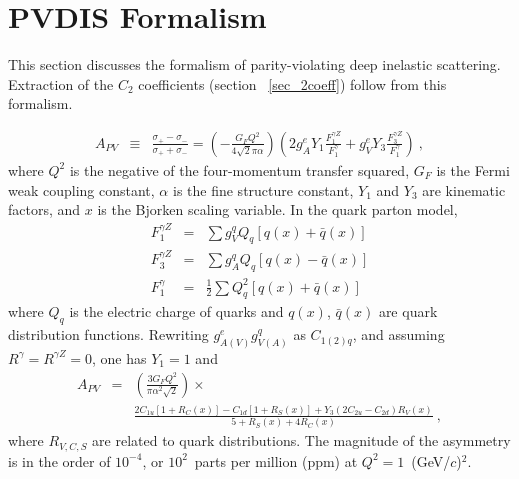 \section{PVDIS Formalism}\label{sec:formalism}

This section discusses the formalism of parity-violating deep inelastic
scattering.  Extraction of the $C_2$ coefficients (section ~\ref{sec_2coeff}) 
follow from this formalism.

%
\begin {eqnarray}
A_{PV}  &\equiv& \frac{\sigma_{+} - \sigma_{-}}{\sigma_{+} + \sigma_{-}}
=\left(-\frac{G_FQ^2}{4\sqrt{2}\pi \alpha}\right)
  \left(2g_A^e Y_1\frac{F_1^{\gamma Z}}{F_1^\gamma}+{g_V^e}Y_3\frac{F_3^{\gamma Z}}{F_1^\gamma}\right)~,
\end{eqnarray}
where $Q^2$ is the negative of the 
four-momentum transfer squared, $G_F$ is the Fermi weak coupling constant, 
$\alpha$ is the fine structure constant, $Y_1$ and $Y_3$ are kinematic factors,
and $x$ is the Bjorken scaling variable. %
In the quark parton model,
\begin{eqnarray}
 F_1^{\gamma Z} &=& \sum{g_V^q Q_q\left[q(x) + \bar q(x)\right]} \\
 F_3^{\gamma Z} &=& \sum{g_A^q Q_q\left[q(x) - \bar q(x)\right]} \\
 F_1^{\gamma} &=& \frac{1}{2}\sum{Q_q^2\left[q(x) + \bar q(x)\right]}
\end{eqnarray}
where $Q_q$ is the electric charge of quarks and 
$q(x)$, $\bar q(x)$ are quark distribution functions.
Rewriting $g_{A(V)}^e g_{V(A)}^q$ as $C_{1(2)q}$, and assuming
$R^\gamma = R^{\gamma Z} = 0$, one has $Y_1=1$ and
\begin {eqnarray}
 A_{PV} &=&\left(\frac{3G_FQ^2}{\pi \alpha^2 \sqrt{2}}\right)\times \nonumber\\
 && \frac{2C_{1u}[1+R_C(x)]-C_{1d}[1+R_S(x)]+Y_3(2C_{2u}-C_{2d})R_V(x)}{5+R_S(x)+4R_C(x)}~,
\end{eqnarray}
%
where $R_{V,C,S}$ are related to quark distributions.
The magnitude of the asymmetry is in the order of $10^{-4}$, or $10^2$~parts per million
(ppm) at $Q^2=1$~(GeV/$c$)$^2$.


